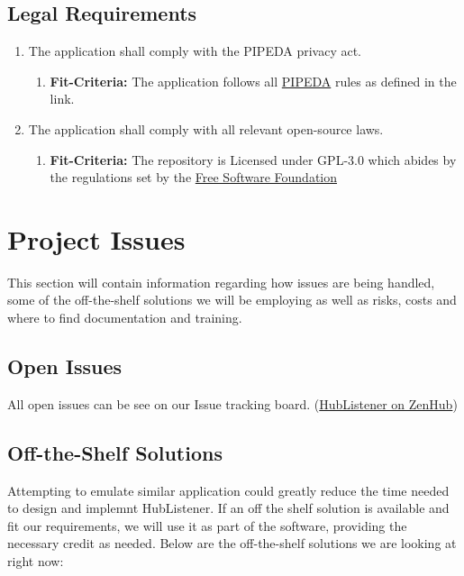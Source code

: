 \documentclass{article}
\begin{document}
\subsection{Legal Requirements}
\begin{enumerate}
\item The application shall comply with the PIPEDA privacy act.
   \begin{enumerate}
    \item \textbf{Fit-Criteria:}  The application follows all  \href{https://www.priv.gc.ca/en/privacy-topics/privacy-laws-in-canada/the-personal-information-protection-and-electronic-documents-act-pipeda/}{PIPEDA} rules as defined in the link.
    \end{enumerate}
\item The application shall comply with all relevant open-source laws. 
   \begin{enumerate}
    \item \textbf{Fit-Criteria:}  The repository is Licensed under GPL-3.0 which abides by the regulations set by the \href{https://www.fsf.org/}{Free Software Foundation} 
    \end{enumerate}
\end{enumerate}

\newpage
\section{Project Issues }
This section will contain information regarding how issues are being handled, some of the off-the-shelf solutions we will be employing as well as risks, costs and where to find documentation and training. 

\subsection{Open Issues}
All open issues can be see on our Issue tracking board. (\href{ https://app.zenhub.com/workspaces/hublistener-5bad6c4d4b5806bc2bea488f/boards?repos=150634456}{HubListener on ZenHub})
\subsection{Off-the-Shelf Solutions}
Attempting to emulate similar application could greatly reduce the time needed to design and implemnt HubListener. If an off the shelf solution is available and fit our requirements, we will use it as part of the software, providing the necessary credit as needed. Below are the off-the-shelf solutions we are looking at right now:
\end{document}
